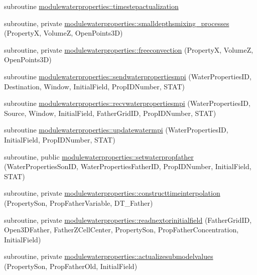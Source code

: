 \begin{DoxyCompactItemize}
\item 
subroutine \mbox{\hyperlink{namespacemodulewaterproperties_a96402f50a619ea1b6477bb32d13a9020}{modulewaterproperties\+::timestepactualization}}
\item 
subroutine, private \mbox{\hyperlink{namespacemodulewaterproperties_ad38f0837c272b87901bd3963788eb9e9}{modulewaterproperties\+::smalldepthsmixing\+\_\+processes}} (PropertyX, VolumeZ, Open\+Points3D)
\item 
subroutine, private \mbox{\hyperlink{namespacemodulewaterproperties_a2ac3ef009338f33bfef1ccc910ccf6d7}{modulewaterproperties\+::freeconvection}} (PropertyX, VolumeZ, Open\+Points3D)
\item 
subroutine \mbox{\hyperlink{namespacemodulewaterproperties_a06e60ba3cd186c1e0cc2c534f1148b41}{modulewaterproperties\+::sendwaterpropertiesmpi}} (Water\+Properties\+ID, Destination, Window, Initial\+Field, Prop\+I\+D\+Number, S\+T\+AT)
\item 
subroutine \mbox{\hyperlink{namespacemodulewaterproperties_ae6984c00ccf20f1bc66a14e9e9466c38}{modulewaterproperties\+::recvwaterpropertiesmpi}} (Water\+Properties\+ID, Source, Window, Initial\+Field, Father\+Grid\+ID, Prop\+I\+D\+Number, S\+T\+AT)
\item 
subroutine \mbox{\hyperlink{namespacemodulewaterproperties_a12cedfb20b7e67e1de82bb36c9375e95}{modulewaterproperties\+::updatewatermpi}} (Water\+Properties\+ID, Initial\+Field, Prop\+I\+D\+Number, S\+T\+AT)
\item 
subroutine, public \mbox{\hyperlink{namespacemodulewaterproperties_abab3678d93906f85e9e8392ced1e6ab4}{modulewaterproperties\+::setwaterpropfather}} (Water\+Properties\+Son\+ID, Water\+Properties\+Father\+ID, Prop\+I\+D\+Number, Initial\+Field, S\+T\+AT)
\item 
subroutine, private \mbox{\hyperlink{namespacemodulewaterproperties_affcb95213dcebf7b3e1fe53b349d50b6}{modulewaterproperties\+::constructtimeinterpolation}} (Property\+Son, Prop\+Father\+Variable, D\+T\+\_\+\+Father)
\item 
subroutine, private \mbox{\hyperlink{namespacemodulewaterproperties_a70dce18437eed5f486027590c6d6a511}{modulewaterproperties\+::readnextorinitialfield}} (Father\+Grid\+ID, Open3\+D\+Father, Father\+Z\+Cell\+Center, Property\+Son, Prop\+Father\+Concentration, Initial\+Field)
\item 
subroutine, private \mbox{\hyperlink{namespacemodulewaterproperties_a1c0bebcf1f9e3c75094930d29edfdcca}{modulewaterproperties\+::actualizesubmodelvalues}} (Property\+Son, Prop\+Father\+Old, Initial\+Field)

\end{DoxyCompactItemize}
